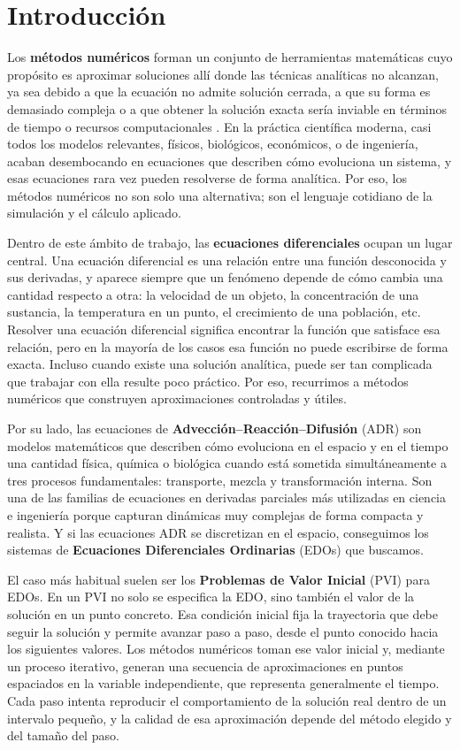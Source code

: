 \chapter{Introducción}

Los \textbf{métodos numéricos} forman un conjunto de herramientas matemáticas cuyo propósito es aproximar soluciones allí donde las técnicas analíticas no alcanzan, ya sea debido a que la ecuación no admite solución cerrada, a que su forma es demasiado compleja o a que obtener la solución exacta sería inviable en términos de tiempo o recursos computacionales \cite{Griffiths2010}. En la práctica científica moderna, casi todos los modelos relevantes, físicos, biológicos, económicos, o de ingeniería, acaban desembocando en ecuaciones que describen cómo evoluciona un sistema, y esas ecuaciones rara vez pueden resolverse de forma analítica. Por eso, los métodos numéricos no son solo una alternativa; son el lenguaje cotidiano de la simulación y el cálculo aplicado.

Dentro de este ámbito de trabajo, las \textbf{ecuaciones diferenciales} ocupan un lugar central. Una ecuación diferencial es una relación entre una función desconocida y sus derivadas, y aparece siempre que un fenómeno depende de cómo cambia una cantidad respecto a otra: la velocidad de un objeto, la concentración de una sustancia, la temperatura en un punto, el crecimiento de una población, etc. Resolver una ecuación diferencial significa encontrar la función que satisface esa relación, pero en la mayoría de los casos esa función no puede escribirse de forma exacta. Incluso cuando existe una solución analítica, puede ser tan complicada que trabajar con ella resulte poco práctico. Por eso, recurrimos a métodos numéricos que construyen aproximaciones controladas y útiles. 

Por su lado, las ecuaciones de \textbf{Advección–Reacción–Difusión} (ADR) son modelos matemáticos que describen cómo evoluciona en el espacio y en el tiempo una cantidad física, química o biológica cuando está sometida simultáneamente a tres procesos fundamentales: transporte, mezcla y transformación interna. Son una de las familias de ecuaciones en derivadas parciales más utilizadas en ciencia e ingeniería porque capturan dinámicas muy complejas de forma compacta y realista. Y si las ecuaciones ADR se discretizan en el espacio\cite{Hairer1993}, conseguimos los sistemas de \textbf{Ecuaciones Diferenciales Ordinarias} (EDOs) que buscamos.

El caso más habitual suelen ser los \textbf{Problemas de Valor Inicial} (PVI) para EDOs. En un PVI no solo se especifica la EDO, sino también el valor de la solución en un punto concreto. Esa condición inicial fija la trayectoria que debe seguir la solución y permite avanzar paso a paso, desde el punto conocido hacia los siguientes valores\cite{Heath2002}. Los métodos numéricos toman ese valor inicial y, mediante un proceso iterativo, generan una secuencia de aproximaciones en puntos espaciados en la variable independiente, que representa generalmente el tiempo. Cada paso intenta reproducir el comportamiento de la solución real dentro de un intervalo pequeño, y la calidad de esa aproximación depende del método elegido y del tamaño del paso.

